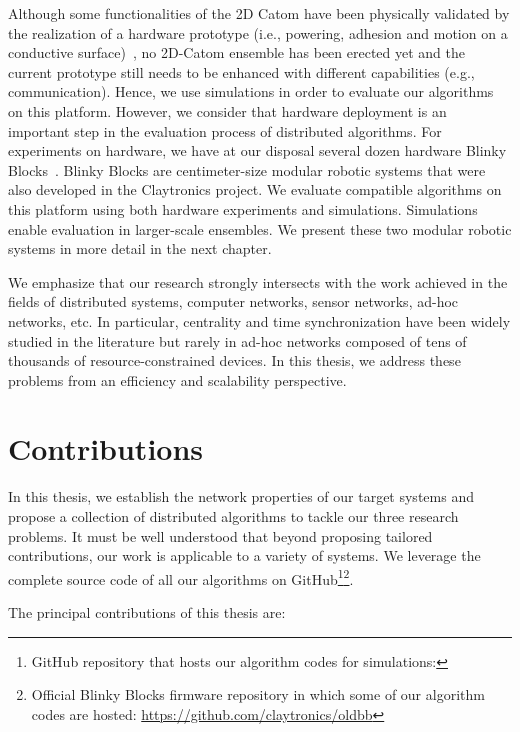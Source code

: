 Although some functionalities of the 2D Catom have been physically validated by the realization of a hardware prototype (i.e., powering, adhesion and motion on a conductive surface)~\cite{karagozler-iros09}, no 2D-Catom ensemble has been erected yet and the current prototype still needs to be enhanced with different capabilities (e.g., communication). Hence, we use simulations in order to evaluate our algorithms on this platform. However, we consider that hardware deployment is an important step in the evaluation process of distributed algorithms. For experiments on hardware, we have at our disposal several dozen hardware Blinky Blocks~\cite{Kirby-chi11}. Blinky Blocks are centimeter-size modular robotic systems that were also developed in the Claytronics project. We evaluate compatible algorithms on this platform using both hardware experiments and simulations. Simulations enable evaluation in larger-scale ensembles. We present these two modular robotic systems in more detail in the next chapter.

We emphasize that our research strongly intersects with the work achieved in the fields of distributed systems, computer networks, sensor networks, ad-hoc networks, etc. In particular, centrality and time synchronization have been widely studied in the literature but rarely in ad-hoc networks composed of tens of thousands of resource-constrained devices. In this thesis, we address these problems from an efficiency and scalability perspective.

\section{Contributions}

In this thesis, we establish the network properties of our target systems and propose a collection of distributed algorithms to tackle our three research problems. It must be well understood that beyond proposing tailored contributions, our work is applicable to a variety of systems. We leverage the complete source code of all our algorithms on GitHub\footnote{GitHub repository that hosts our algorithm codes for simulations: \VisibleSimUrl{}}\footnote{Official Blinky Blocks firmware repository in which some of our algorithm codes are hosted: \url{https://github.com/claytronics/oldbb}}.

The principal contributions of this thesis are:


